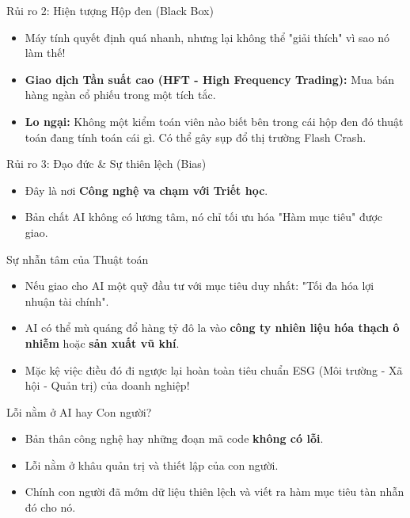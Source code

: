 \documentclass[aspectratio=169,12pt]{beamer}
\begin{document}
\begin{frame}{Rủi ro 2: Hiện tượng Hộp đen (Black Box)}
    \begin{itemize}
        \item Máy tính quyết định quá nhanh, nhưng lại không thể "giải thích" vì sao nó làm thế!
        \item \textbf{Giao dịch Tần suất cao (HFT - High Frequency Trading):} Mua bán hàng ngàn cổ phiếu trong một tích tắc.
        \item \textbf{Lo ngại:} Không một kiểm toán viên nào biết bên trong cái hộp đen đó thuật toán đang tính toán cái gì. Có thể gây sụp đổ thị trường Flash Crash.
    \end{itemize}
\end{frame}

\begin{frame}{Rủi ro 3: Đạo đức \& Sự thiên lệch (Bias)}
    \begin{itemize}
        \item Đây là nơi \textbf{Công nghệ va chạm với Triết học}.
        \item Bản chất AI không có lương tâm, nó chỉ tối ưu hóa "Hàm mục tiêu" được giao.
    \end{itemize}
\end{frame}

\begin{frame}{Sự nhẫn tâm của Thuật toán}
    \begin{itemize}
        \item Nếu giao cho AI một quỹ đầu tư với mục tiêu duy nhất: "Tối đa hóa lợi nhuận tài chính".
        \item AI có thể mù quáng đổ hàng tỷ đô la vào \textbf{công ty nhiên liệu hóa thạch ô nhiễm} hoặc \textbf{sản xuất vũ khí}.
        \item Mặc kệ việc điều đó đi ngược lại hoàn toàn tiêu chuẩn ESG (Môi trường - Xã hội - Quản trị) của doanh nghiệp!
    \end{itemize}
\end{frame}

\begin{frame}{Lỗi nằm ở AI hay Con người?}
    \begin{itemize}
        \item Bản thân công nghệ hay những đoạn mã code \textbf{không có lỗi}.
        \item Lỗi nằm ở khâu quản trị và thiết lập của con người.
        \item Chính con người đã mớm dữ liệu thiên lệch và viết ra hàm mục tiêu tàn nhẫn đó cho nó.
    \end{itemize}
\end{frame}
\end{document}
